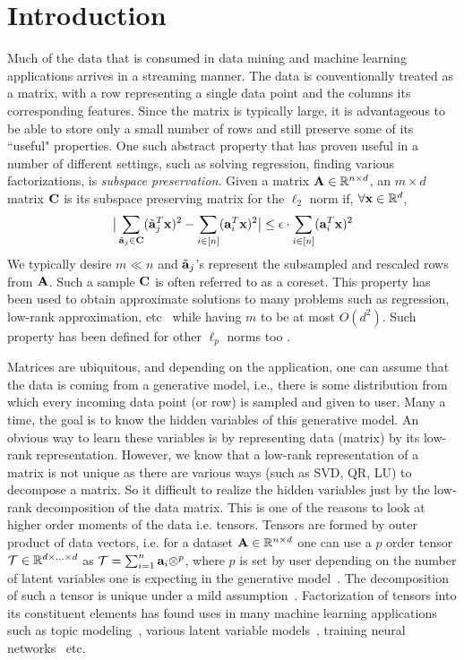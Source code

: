 \section{Introduction}
Much of the data that is consumed in data mining and machine learning applications arrives in a streaming manner. The data is conventionally treated as a matrix, with a row representing a single data point and the columns its corresponding features. Since the matrix is typically large, it is advantageous to be able to store only a small number of rows and still preserve some of its ``useful" properties. One such abstract property that has proven useful in a number of different settings, such as solving regression, finding various factorizations, is {\em subspace preservation}. Given a matrix $\mathbf{A} \in \mathbb{R}^{n \times d}$, an $m \times d$ matrix $\mathbf{C}$ is its subspace preserving matrix for the $\ell_2$ norm if, $\forall \mathbf{x} \in \mathbb{R}^{d}$,
\begin{align*}
    \big| \sum_{\tilde{\mathbf{a}}_{j} \in \mathbf{C}}(\tilde{\mathbf{a}}_{j}^T \mathbf{x})^2 - \sum_{i \in [n]}(\mathbf{a}_{i}^T \mathbf{x})^2\big|\leq\epsilon \cdot \sum_{i \in [n]}(\mathbf{a}_{i}^T \mathbf{x})^2
\end{align*}
We typically desire $m \ll n$ and $\tilde{\mathbf{a}}_{j}$'s represent the subsampled and rescaled rows from $\mathbf{A}$. Such a sample $\mathbf{C}$ is often referred to as a coreset.
This property has been used to obtain approximate solutions to many problems such as regression, low-rank approximation, etc~\cite{woodruff2014sketching} while having $m$ to be at most $O(d^2)$. Such property has been defined for other $\ell_p$ norms too \cite{dasgupta2009sampling,cohen2015p,clarkson2016fast}. 

Matrices are ubiquitous, and depending on the application, one can assume that the data is coming from a generative model, i.e., there is some distribution from which every incoming data point (or row) is sampled and given to user. Many a time, the goal is to know the hidden variables of this generative model. An obvious way to learn these variables is by representing data (matrix) by its low-rank representation. However, we know that a low-rank representation of a matrix is not unique as there are various ways (such as SVD, QR, LU)  to decompose a matrix. So it difficult to realize the hidden variables just by the low-rank decomposition of the data matrix.
This is one of the reasons to look at higher order moments of the data i.e. tensors. Tensors are formed by outer product of data vectors, i.e. for a dataset $\mathbf{A} \in \mathbb{R}^{n \times d}$ one can use a $p$ order tensor $\mathbf{\mathcal{T}} \in \mathbb{R}^{d \times \ldots \times d}$ as $\mathbf{\mathcal{T}} = \sum_{i=1}^{n} \mathbf{a}_{i} \otimes^{p}$, where $p$ is set by user depending on the number of latent variables one is expecting in the generative model~\cite{ma2016polynomial}. The decomposition of such a tensor is unique under a mild assumption~\cite{kruskal1977three}. 
Factorization of tensors into its constituent elements has found uses in many machine learning applications such as topic modeling~\cite{anandkumar2014tensor}, various latent variable models~\cite{anandkumar2012method,hsu2012spectral,jenatton2012latent}, training neural networks~\cite{janzamin2015beating} etc. 

